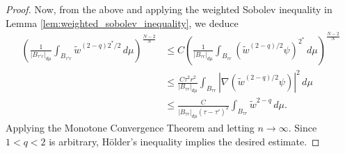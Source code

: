 \documentclass[11pt]{article}
\begin{document}
\begin{proof}
Now, from the above and applying the weighted Sobolev inequality in Lemma \ref{lem:weighted_sobolev_inequality}, we deduce
\begin{equation*}
\begin{aligned}
\left( \frac{1}{|B_{\tau' r}|_{d\mu}} \int_{B_{\tau' r}} \widetilde{w}^{(2 - q)2^*/2 } \, d\mu \right)^{\frac{N - 2}{N}}
&\leq C \left( \frac{1}{|B_{\tau r}|_{d\mu}} \int_{B_{\tau r}} \left( \widetilde{w}^{(2 - q)/2} \psi \right)^{2^*} \, d\mu \right)^{\frac{N - 2}{N}}\\
&\leq \frac{C \tau^2 r^2}{|B_{\tau r}|_{d\mu}} \int_{B_{\tau r}} 
\left| \nabla\left( \widetilde{w}^{(2 - q)/2} \psi \right) \right|^2 \, d\mu \\
&\leq \frac{C}{|B_{\tau r}|_{d\mu} (\tau - \tau')^2} \int_{B_{\tau r}} \widetilde{w}^{2 - q} \, d\mu.
\end{aligned}
\end{equation*}
Applying the Monotone Convergence Theorem and letting \( n \to \infty \). Since \( 1 < q < 2 \) is arbitrary, H\"{o}lder's inequality implies the desired estimate.
\end{proof}
\end{document}
